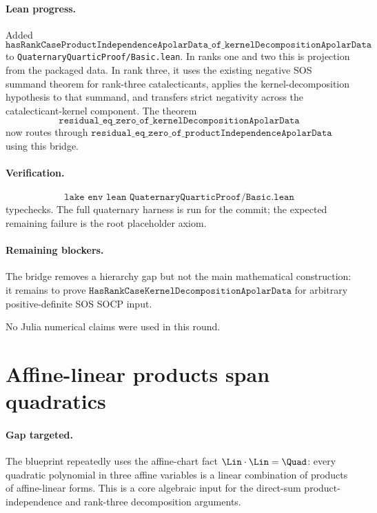 \documentclass[11pt]{article}
\begin{document}
\paragraph{Lean progress.}
Added
\[
\texttt{hasRankCaseProductIndependenceApolarData\_of\_kernelDecompositionApolarData}
\]
to \texttt{QuaternaryQuarticProof/Basic.lean}.  In ranks one and two this is
projection from the packaged data.  In rank three, it uses the existing
negative SOS summand theorem for rank-three catalecticants, applies the
kernel-decomposition hypothesis to that summand, and transfers strict
negativity across the catalecticant-kernel component.  The theorem
\[
\texttt{residual\_eq\_zero\_of\_kernelDecompositionApolarData}
\]
now routes through
\(\texttt{residual\_eq\_zero\_of\_productIndependenceApolarData}\) using this
bridge.

\paragraph{Verification.}
\[
\texttt{lake env lean QuaternaryQuarticProof/Basic.lean}
\]
typechecks.  The full quaternary harness is run for the commit; the expected
remaining failure is the root placeholder axiom.

\paragraph{Remaining blockers.}
The bridge removes a hierarchy gap but not the main mathematical construction:
it remains to prove \(\texttt{HasRankCaseKernelDecompositionApolarData}\) for
arbitrary positive-definite SOS SOCP input.

No Julia numerical claims were used in this round.

\section*{Affine-linear products span quadratics}

\paragraph{Gap targeted.}
The blueprint repeatedly uses the affine-chart fact
\(\Lin\cdot\Lin=\Quad\): every quadratic polynomial in three affine variables
is a linear combination of products of affine-linear forms.  This is a core
algebraic input for the direct-sum product-independence and rank-three
decomposition arguments.
\end{document}
